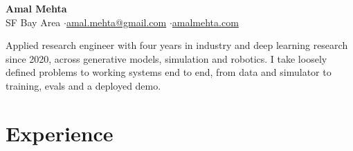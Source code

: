 \documentclass[10pt]{article}
\begin{document}
\fontsize{9.8}{10.8}\selectfont

\begin{center}
{\LARGE\bfseries Amal Mehta}\\[3pt]
SF Bay Area \quad$\cdot$\quad \href{mailto:amal.mehta@gmail.com}{amal.mehta@gmail.com} \quad$\cdot$\quad \href{https://amalmehta.com/}{amalmehta.com}
\end{center}

Applied research engineer with four years in industry and deep learning research since 2020, across generative models, simulation and robotics. I take loosely defined problems to working systems end to end, from data and simulator to training, evals and a deployed demo.

\section*{Experience}
\end{document}
